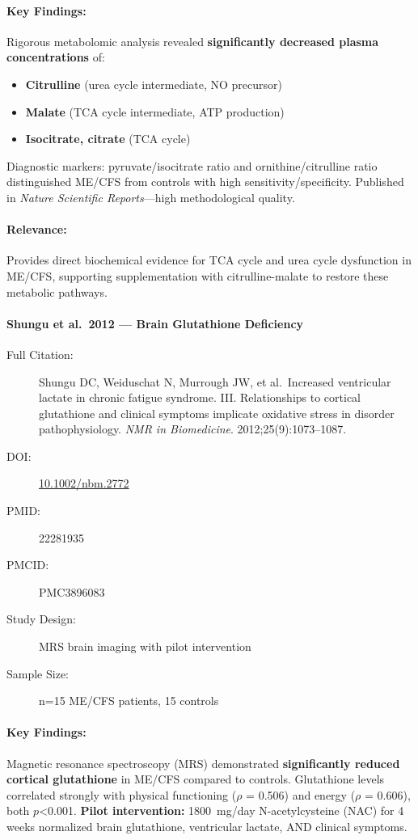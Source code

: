 \paragraph{Key Findings:}
Rigorous metabolomic analysis revealed \textbf{significantly decreased plasma concentrations} of:
\begin{itemize}
    \item \textbf{Citrulline} (urea cycle intermediate, NO precursor)
    \item \textbf{Malate} (TCA cycle intermediate, ATP production)
    \item \textbf{Isocitrate, citrate} (TCA cycle)
\end{itemize}
Diagnostic markers: pyruvate/isocitrate ratio and ornithine/citrulline ratio distinguished ME/CFS from controls with high sensitivity/specificity. Published in \textit{Nature Scientific Reports}---high methodological quality.

\paragraph{Relevance:}
Provides direct biochemical evidence for TCA cycle and urea cycle dysfunction in ME/CFS, supporting supplementation with citrulline-malate to restore these metabolic pathways.

\paragraph{Shungu et al.\ 2012 --- Brain Glutathione Deficiency}

\begin{description}
    \item[Full Citation:] Shungu DC, Weiduschat N, Murrough JW, et al.\ Increased ventricular lactate in chronic fatigue syndrome. III. Relationships to cortical glutathione and clinical symptoms implicate oxidative stress in disorder pathophysiology. \textit{NMR in Biomedicine}. 2012;25(9):1073--1087.
    \item[DOI:] \href{https://doi.org/10.1002/nbm.2772}{10.1002/nbm.2772}
    \item[PMID:] 22281935
    \item[PMCID:] PMC3896083
    \item[Study Design:] MRS brain imaging with pilot intervention
    \item[Sample Size:] n=15 ME/CFS patients, 15 controls
\end{description}

\paragraph{Key Findings:}
Magnetic resonance spectroscopy (MRS) demonstrated \textbf{significantly reduced cortical glutathione} in ME/CFS compared to controls. Glutathione levels correlated strongly with physical functioning ($\rho$ = 0.506) and energy ($\rho$ = 0.606), both $p$<0.001. \textbf{Pilot intervention:} 1800~mg/day N-acetylcysteine (NAC) for 4 weeks normalized brain glutathione, ventricular lactate, AND clinical symptoms.

